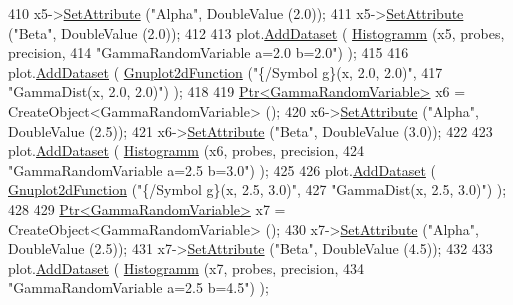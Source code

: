 \begin{DoxyCode}
410     x5->\hyperlink{classns3_1_1ObjectBase_ac60245d3ea4123bbc9b1d391f1f6592f}{SetAttribute} (\textcolor{stringliteral}{"Alpha"}, DoubleValue (2.0));
411     x5->\hyperlink{classns3_1_1ObjectBase_ac60245d3ea4123bbc9b1d391f1f6592f}{SetAttribute} (\textcolor{stringliteral}{"Beta"}, DoubleValue (2.0));
412 
413     plot.\hyperlink{classns3_1_1Gnuplot_a306ec724a327cf9ab699700f31fca0a1}{AddDataset} ( \hyperlink{main-random-variable_8cc_a2cfd3837ab3f2e816cf53486d7a186b5}{Histogramm} (x5, probes, precision,
414                                   \textcolor{stringliteral}{"GammaRandomVariable a=2.0 b=2.0"}) );
415 
416     plot.\hyperlink{classns3_1_1Gnuplot_a306ec724a327cf9ab699700f31fca0a1}{AddDataset} ( \hyperlink{classns3_1_1Gnuplot2dFunction}{Gnuplot2dFunction} (\textcolor{stringliteral}{"\{/Symbol g\}(x, 2.0, 2.0)"},
417                                          \textcolor{stringliteral}{"GammaDist(x, 2.0, 2.0)"}) );
418 
419     \hyperlink{classns3_1_1Ptr}{Ptr<GammaRandomVariable>} x6 = CreateObject<GammaRandomVariable> ();
420     x6->\hyperlink{classns3_1_1ObjectBase_ac60245d3ea4123bbc9b1d391f1f6592f}{SetAttribute} (\textcolor{stringliteral}{"Alpha"}, DoubleValue (2.5));
421     x6->\hyperlink{classns3_1_1ObjectBase_ac60245d3ea4123bbc9b1d391f1f6592f}{SetAttribute} (\textcolor{stringliteral}{"Beta"}, DoubleValue (3.0));
422 
423     plot.\hyperlink{classns3_1_1Gnuplot_a306ec724a327cf9ab699700f31fca0a1}{AddDataset} ( \hyperlink{main-random-variable_8cc_a2cfd3837ab3f2e816cf53486d7a186b5}{Histogramm} (x6, probes, precision,
424                                   \textcolor{stringliteral}{"GammaRandomVariable a=2.5 b=3.0"}) );
425 
426     plot.\hyperlink{classns3_1_1Gnuplot_a306ec724a327cf9ab699700f31fca0a1}{AddDataset} ( \hyperlink{classns3_1_1Gnuplot2dFunction}{Gnuplot2dFunction} (\textcolor{stringliteral}{"\{/Symbol g\}(x, 2.5, 3.0)"},
427                                          \textcolor{stringliteral}{"GammaDist(x, 2.5, 3.0)"}) );
428 
429     \hyperlink{classns3_1_1Ptr}{Ptr<GammaRandomVariable>} x7 = CreateObject<GammaRandomVariable> ();
430     x7->\hyperlink{classns3_1_1ObjectBase_ac60245d3ea4123bbc9b1d391f1f6592f}{SetAttribute} (\textcolor{stringliteral}{"Alpha"}, DoubleValue (2.5));
431     x7->\hyperlink{classns3_1_1ObjectBase_ac60245d3ea4123bbc9b1d391f1f6592f}{SetAttribute} (\textcolor{stringliteral}{"Beta"}, DoubleValue (4.5));
432 
433     plot.\hyperlink{classns3_1_1Gnuplot_a306ec724a327cf9ab699700f31fca0a1}{AddDataset} ( \hyperlink{main-random-variable_8cc_a2cfd3837ab3f2e816cf53486d7a186b5}{Histogramm} (x7, probes, precision,
434                                   \textcolor{stringliteral}{"GammaRandomVariable a=2.5 b=4.5"}) );

\end{DoxyCode}
